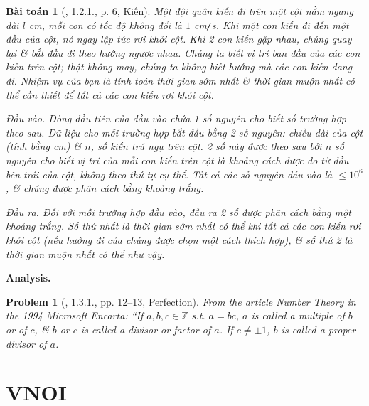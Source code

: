 \documentclass{article}
\newtheorem{baitoan}{Bài toán}
\newtheorem{problem}{Problem}
\begin{document}
\begin{baitoan}[\cite{Wu_Wang2018}, 1.2.1., p. 6, Kiến]
	Một đội quân kiến đi trên một cột nằm ngang dài $l$ {\rm cm}, mỗi con có tốc độ không đổi là $1$ {\rm cm{\tt/}s}. Khi một con kiến đi đến một đầu của cột, nó ngay lập tức rơi khỏi cột. Khi 2 con kiến gặp nhau, chúng quay lại \& bắt đầu đi theo hướng ngược nhau. Chúng ta biết vị trí ban đầu của các con kiến trên cột; thật không may, chúng ta không biết hướng mà các con kiến đang đi. Nhiệm vụ của bạn là tính toán thời gian sớm nhất \& thời gian muộn nhất có thể cần thiết để tất cả các con kiến rơi khỏi cột.
	\item {\sf Đầu vào.} Dòng đầu tiên của đầu vào chứa 1 số nguyên cho biết số trường hợp theo sau. Dữ liệu cho mỗi trường hợp bắt đầu bằng 2 số nguyên: chiều dài của cột (tính bằng {\rm cm}) \& $n$, số kiến trú ngụ trên cột. 2 số này được theo sau bởi $n$ số nguyên cho biết vị trí của mỗi con kiến trên cột là khoảng cách được đo từ đầu bên trái của cột, không theo thứ tự cụ thể. Tất cả các số nguyên đầu vào là $\le10^6$, \& chúng được phân cách bằng khoảng trắng.
	\item {\sf Đầu ra.} Đối với mỗi trường hợp đầu vào, đầu ra 2 số được phân cách bằng một khoảng trắng. Số thứ nhất là thời gian sớm nhất có thể khi tất cả các con kiến rơi khỏi cột (nếu hướng đi của chúng được chọn một cách thích hợp), \& số thứ 2 là thời gian muộn nhất có thể như vậy.
\end{baitoan}
\textbf{\textsf{Analysis.}} 

\begin{problem}[\cite{Wu_Wang2018}, 1.3.1., pp. 12--13, Perfection]
	From the article Number Theory in the 1994 Microsoft Encarta: ``If $a,b,c\in\mathbb{Z}$ s.t. $a = bc$, $a$ is called a multiple of $b$ or of $c$, \& $b$ or $c$ is called a {\rm divisor} or {\rm factor} of $a$. If $c\ne\pm1$, $b$ is called a {\rm proper divisor} of $a$.
\end{problem}


\section{VNOI}
\end{document}
